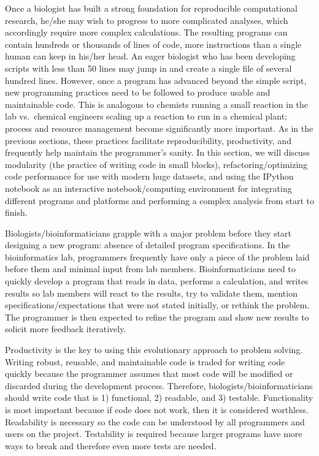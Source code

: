 \documentclass[ChapterTOCs,krantz2]{krantz} %
\begin{document}
Once a biologist has built a strong foundation for reproducible computational
research, he/she may wish to progress to more complicated analyses, which
accordingly require more complex calculations.  The resulting programs can
contain hundreds or thousands of lines of code, more instructions than a single
human can keep in his/her head.  An eager biologist who has been developing 
scripts with less than 50 lines may jump in and create a single file of
several hundred lines.  However, once a program has advanced beyond the
simple script, new programming practices need to be followed to produce usable
and maintainable code.  This is analogous to chemists running a small reaction
in the lab vs.\ chemical engineers scaling up a reaction to run in a chemical
plant; process and resource management become significantly more important.  As in the
previous sections, these practices facilitate reproducibility,
productivity, and frequently help maintain the programmer's sanity.  In this
section, we will discuss modularity (the practice of writing code in small blocks), 
refactoring/optimizing code performance for use with
modern huge datasets, and using the IPython notebook as an interactive
notebook/computing environment for integrating different programs and platforms
and performing a complex analysis from start to finish.

Biologists/bioinformaticians grapple with a major problem before they start 
designing a new program:
absence of detailed program specifications\cite{Segal2007}.
In the bioinformatics lab, programmers frequently have only a piece of
the problem laid before them and minimal input from lab members.  
Bioinformaticians need to quickly
develop a program that reads in data, performs a calculation, and writes
results so lab members will react to the results, try to validate them, mention
specifications/expectations that were not stated initially, or
rethink the problem.  The programmer is then
expected to refine the program and show new results to
solicit more feedback iteratively. 

Productivity is the key to using this evolutionary approach to problem solving.  
Writing robust, reusable, and maintainable code is traded for
writing code quickly because the programmer assumes that most code will be
modified or discarded during the development process.  Therefore,
biologists/bioinformaticians should write code that is 1) functional, 2)
readable, and 3) testable.  Functionality is most important because if code
does not work, then it is considered worthless\cite{Kelly2008}.
Readability is necessary so the code can be understood by all programmers and users
on the project.  
Testability is required
because larger programs have more ways to break and therefore even more tests
are needed.
\end{document}
